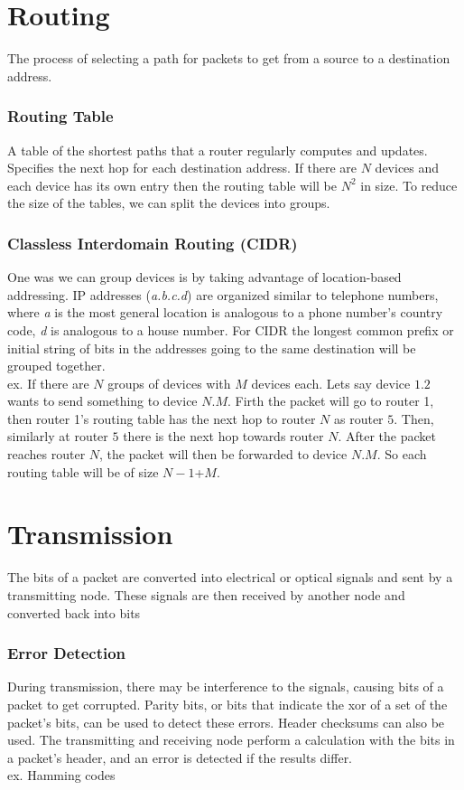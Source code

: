 \section{Routing}
The process of selecting a path for packets to get from a source to a destination address. 
\subsubsection*{Routing Table}
A table of the shortest paths that a router regularly computes and updates. Specifies the next hop for each destination address. If there are $N$ devices and each device has its own entry then the routing table will be $N^2$ in size. To reduce the size of the tables, we can split the devices into groups.
\subsubsection*{Classless Interdomain Routing (CIDR)}
One was we can group devices is by taking advantage of location-based addressing. IP addresses (\textit{a.b.c.d}) are organized similar to telephone numbers, where \textit{a} is the most general location is analogous to a phone number's country code, \textit{d} is analogous to a house number. For CIDR the longest common prefix or initial string of bits in the addresses going to the same destination will be grouped together. \\
ex. If there are $N$ groups of devices with $M$ devices each. Lets say device $1.2$ wants to send something to device $N.M$. Firth the packet will go to router 1, then router 1's routing table has the next hop to router $N$ as router $5$. Then, similarly at router $5$ there is the next hop towards router $N$. After the packet reaches router $N$, the packet will then be forwarded to device $N.M$. So each routing table will be of size $N-1$+$M$.  

\section{Transmission}
The bits of a packet are converted into electrical or optical signals and sent by a transmitting node. These signals are then received by another node and converted back into bits
\subsubsection*{Error Detection}
During transmission, there may be interference to the signals, causing bits of a packet to get corrupted. Parity bits, or bits that indicate the xor of a set of the packet's bits, can be used to detect these errors. Header checksums can also be used. The transmitting and receiving node perform a calculation with the bits in a packet's header, and an error is detected if the results differ. \\
ex. Hamming codes

